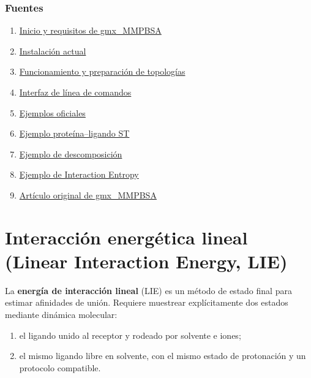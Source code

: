 \documentclass[
  spanish,
  11pt,
  a4paper]{article}
\providecommand{\tightlist}{%
  \setlength{\itemsep}{0pt}\setlength{\parskip}{0pt}}
\begin{document}
\subsubsection{Fuentes}\label{fuentes-6}

\begin{enumerate}
\def\labelenumi{\arabic{enumi}.}
\tightlist
\item
  \href{https://valdes-tresanco-ms.github.io/gmx_MMPBSA/dev/getting-started/}{Inicio
  y requisitos de gmx\_MMPBSA}
\item
  \href{https://valdes-tresanco-ms.github.io/gmx_MMPBSA/dev/installation/}{Instalación
  actual}
\item
  \href{https://valdes-tresanco-ms.github.io/gmx_MMPBSA/dev/howworks/}{Funcionamiento
  y preparación de topologías}
\item
  \href{https://valdes-tresanco-ms.github.io/gmx_MMPBSA/dev/gmx_MMPBSA_command-line/}{Interfaz
  de línea de comandos}
\item
  \href{https://valdes-tresanco-ms.github.io/gmx_MMPBSA/dev/examples/}{Ejemplos
  oficiales}
\item
  \href{https://valdes-tresanco-ms.github.io/gmx_MMPBSA/dev/examples/Protein_ligand/ST/}{Ejemplo
  proteína--ligando ST}
\item
  \href{https://valdes-tresanco-ms.github.io/gmx_MMPBSA/dev/examples/Decomposition_analysis/}{Ejemplo
  de descomposición}
\item
  \href{https://valdes-tresanco-ms.github.io/gmx_MMPBSA/dev/examples/Entropy_calculations/Interaction_Entropy/}{Ejemplo
  de Interaction Entropy}
\item
  \href{https://pubs.acs.org/doi/10.1021/acs.jctc.1c00645}{Artículo
  original de gmx\_MMPBSA}
\end{enumerate}

\section{Interacción energética lineal (Linear Interaction Energy,
LIE)}\label{interacciuxf3n-energuxe9tica-lineal-linear-interaction-energy-lie}

La \textbf{energía de interacción lineal} (LIE) es un método de estado
final para estimar afinidades de unión. Requiere muestrear
explícitamente dos estados mediante dinámica molecular:

\begin{enumerate}
\def\labelenumi{\arabic{enumi}.}
\tightlist
\item
  el ligando unido al receptor y rodeado por solvente e iones;
\item
  el mismo ligando libre en solvente, con el mismo estado de protonación
  y un protocolo compatible.
\end{enumerate}
\end{document}

